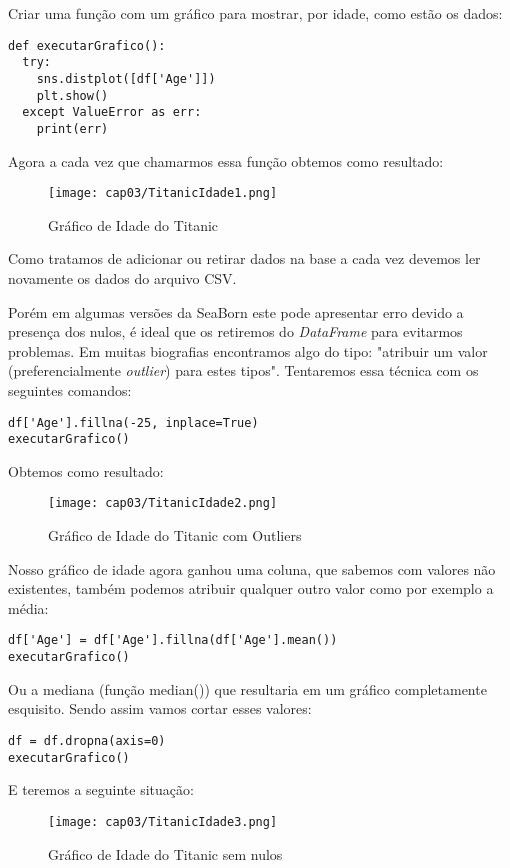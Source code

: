 Criar uma função com um gráfico para mostrar, por idade, como estão os dados:
\begin{lstlisting}
def executarGrafico():
  try:
    sns.distplot([df['Age']])
    plt.show()
  except ValueError as err:
    print(err) 
\end{lstlisting}

Agora a cada vez que chamarmos essa função obtemos como resultado:
\begin{figure}[H]
	\centering
	\texttt{[image: cap03/TitanicIdade1.png]}
	\caption{Gráfico de Idade do Titanic}
\end{figure}

\begin{note} 
	Como tratamos de adicionar ou retirar dados na base a cada vez devemos ler novamente os dados do arquivo CSV.
\end{note}

Porém em algumas versões da SeaBorn este pode apresentar erro devido a presença dos nulos, é ideal que os retiremos do \textit{DataFrame} para evitarmos problemas. Em muitas biografias encontramos algo do tipo: "atribuir um valor (preferencialmente \textit{outlier}) para estes tipos". Tentaremos essa técnica com os seguintes comandos:
\begin{lstlisting}
df['Age'].fillna(-25, inplace=True)
executarGrafico()
\end{lstlisting}

Obtemos como resultado:
\begin{figure}[H]
	\centering
	\texttt{[image: cap03/TitanicIdade2.png]}
	\caption{Gráfico de Idade do Titanic com Outliers}
\end{figure}

Nosso gráfico de idade agora ganhou uma coluna, que sabemos com valores não existentes, também podemos atribuir qualquer outro valor como por exemplo a média:
\begin{lstlisting}
df['Age'] = df['Age'].fillna(df['Age'].mean())
executarGrafico()
\end{lstlisting}

Ou a mediana (função median()) que resultaria em um gráfico completamente esquisito. Sendo assim vamos cortar esses valores:
\begin{lstlisting}
df = df.dropna(axis=0)
executarGrafico()
\end{lstlisting}

E teremos a seguinte situação:
\begin{figure}[H]
	\centering
	\texttt{[image: cap03/TitanicIdade3.png]}
	\caption{Gráfico de Idade do Titanic sem nulos}
\end{figure}

